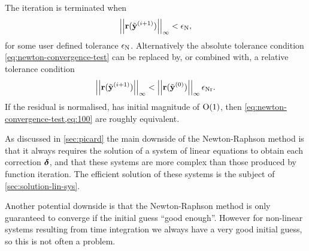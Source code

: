 The iteration is terminated when
\begin{equation}
  \left| \left| \boldsymbol{\mathrm{r}}({\tilde{\boldsymbol{\mathrm{y}}}}^{(i+1)}) \right| \right|_{\infty} < \epsilon_{\mathrm{N}},
\label{eq:newton-convergence-test}
\end{equation}
for some user defined tolerance $\epsilon_{\mathrm{N}}$.
Alternatively the absolute tolerance condition \cref{eq:newton-convergence-test} can be replaced by, or combined with, a relative tolerance condition
\begin{equation}
  \left| \left| \boldsymbol{\mathrm{r}}({\tilde{\boldsymbol{\mathrm{y}}}}^{(i+1)}) \right| \right|_{\infty} < \left| \left| \boldsymbol{\mathrm{r}}({\tilde{\boldsymbol{\mathrm{y}}}}^{(0)}) \right| \right|_{\infty} \epsilon_{\mathrm{Nr}}.
  \label{eq:100}
\end{equation}
If the residual is normalised, \ie has initial magnitude of $\mathrm{O}{\left( 1 \right)}$, then \cref{eq:newton-convergence-test,eq:100} are roughly equivalent.


As discussed in \cref{sec:picard} the main downside of the Newton-Raphson method is that it always requires the solution of a system of linear equations to obtain each correction $\boldsymbol{\mathrm{\delta}}$, and that these systems are more complex than those produced by function iteration.
The efficient solution of these systems is the subject of \cref{sec:solution-lin-sys}.

Another potential downside is that the Newton-Raphson method is only guaranteed to converge if the initial guess ``good enough''.
However for non-linear systems resulting from time integration we always have a very good initial guess, so this is not often a problem.






